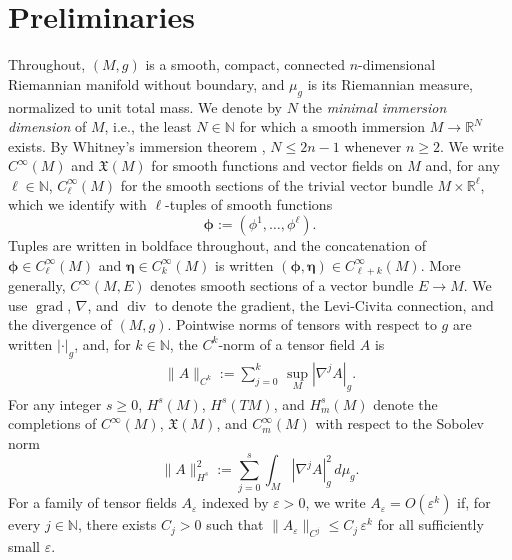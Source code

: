 \documentclass{article}
\theoremstyle{remark}
\newcommand{\M}{M}
\newcommand{\Cinf}{C^{\infty}(\M)}
\newcommand{\CinfV}[1]{C_{#1}^{\infty}(\M)}
\newcommand{\X}{\mathfrak{X}(\M)}
\DeclareMathOperator{\grad}{\mathrm{grad}}
\DeclareMathOperator{\Div}{div}
\begin{document}
\section{Preliminaries}\label{sec:prelim}
%
Throughout, $(\M, g)$ is a smooth, compact, connected $n$-dimensional Riemannian manifold without boundary, and $\mu_g$ is its Riemannian measure, normalized to unit total mass. We denote by $N$ the \emph{minimal immersion dimension} of $\M$, i.e., the least $N\in\mathbb{N}$ for which a smooth immersion $\M\rightarrow\mathbb{R}^N$ exists. By Whitney's immersion theorem \cite[Theorem 6.20]{Lee2012}, $N\leq 2n-1$ whenever $n\geq2$.
%
We write $\Cinf$ and $\X$ for smooth functions and vector fields on $\M$ and, for any $\ell\in\mathbb{N}$, $\CinfV{\ell}$ for the smooth sections of the trivial vector bundle $\M\times\mathbb{R}^\ell$, which we identify with $\ell$-tuples of smooth functions
\[
\bm{\phi}:=(\phi^1,\dots,\phi^\ell).
\]
Tuples are written in boldface throughout, and the concatenation of $\bm{\phi}\in\CinfV{\ell}$ and $\bm{\eta}\in\CinfV{k}$ is written $(\bm{\phi},\bm{\eta})\in\CinfV{\ell+k}$. More generally, $C^\infty(\M,E)$ denotes smooth sections of a vector bundle $E\rightarrow\M$. We use $\grad$, $\nabla$, and $\Div$ to denote the gradient, the Levi-Civita connection, and the divergence of $(\M,g)$. Pointwise norms of tensors with respect to $g$ are written $|\cdot|_g$, and, for $k\in\mathbb{N}$, the $C^k$-norm of a tensor field $A$ is
%
\begin{align*}\textstyle
    \|A\|_{C^k}:=\sum_{j=0}^{k}\,\sup_{\M}|\nabla^jA|_g.
\end{align*}
%
For any integer $s\geq0$, $H^s(\M)$, $H^s(T\M)$, and $H_m^s(\M)$ denote the completions of $\Cinf$, $\X$, and $\CinfV{m}$ with respect to the Sobolev norm
%
$$\textstyle
\|A\|_{H^s}^2:=\sum_{j=0}^{s}\textstyle\int_{\M}|\nabla^jA|_g^2\,d\mu_g.
$$
%
For a family of tensor fields $A_\varepsilon$ indexed by $\varepsilon>0$, we write $A_\varepsilon=O(\varepsilon^k)$ if, for every $j\in\mathbb{N}$, there exists $C_j>0$ such that $\|A_\varepsilon\|_{C^j}\leq C_j\,\varepsilon^k$ for all sufficiently small $\varepsilon$.
%
\end{document}
